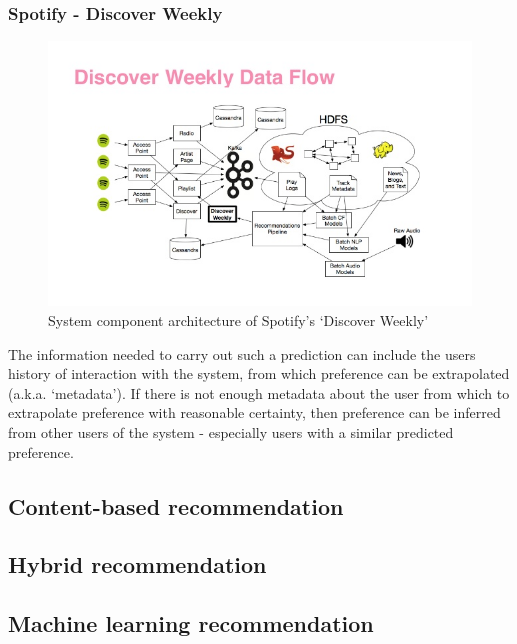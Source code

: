 \documentclass[a4paper,12pt]{article}
\begin{document}
  \subsubsection{Spotify - Discover Weekly}
    \begin{figure}[h]
      \centering
      \includegraphics[width=\linewidth]{images/discoverweekly-dataflow}
      \caption[System component architecture of Spotify's ‘Discover Weekly’]{System component architecture of Spotify's ‘Discover Weekly’ \protect\citep{johnson2015dw}}
      \label{fig:discoverweekly-dataflow}
    \end{figure}

  The information needed to carry out such a prediction can include the users history of interaction with the system, from which preference can be extrapolated (a.k.a. ‘metadata’). If there is not enough metadata about the user from which to extrapolate preference with reasonable certainty, then preference can be inferred from other users of the system - especially users with a similar predicted preference.

  \subsection{Content-based recommendation}

  \subsection{Hybrid recommendation}

  \subsection{Machine learning recommendation}
\end{document}
